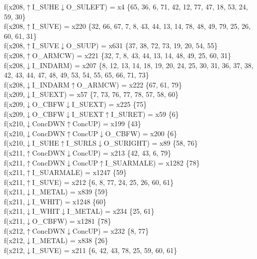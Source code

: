 f(x208,$\uparrow$I\_SUHE$\downarrow$O\_SULEFT) = x4 \{65, 36, 6, 71, 42, 12, 77, 47, 18, 53, 24, 59, 30\} \\  
f(x208,$\uparrow$I\_SUVE) = x220 \{32, 66, 67, 7, 8, 43, 44, 13, 14, 78, 48, 49, 79, 25, 26, 60, 61, 31\} \\  
f(x208,$\uparrow$I\_SUVE$\downarrow$O\_SUUP) = x631 \{37, 38, 72, 73, 19, 20, 54, 55\} \\  
f(x208,$\uparrow$O\_ARMCW) = x221 \{32, 7, 8, 43, 44, 13, 14, 48, 49, 25, 60, 31\} \\  
f(x208,$\downarrow$I\_INDARM) = x207 \{8, 12, 13, 14, 18, 19, 20, 24, 25, 30, 31, 36, 37, 38, 42, 43, 44, 47, 48, 49, 53, 54, 55, 65, 66, 71, 73\} \\  
f(x208,$\downarrow$I\_INDARM$\uparrow$O\_ARMCW) = x222 \{67, 61, 79\} \\  
f(x209,$\downarrow$I\_SUEXT) = x57 \{7, 73, 76, 77, 78, 57, 58, 60\} \\  
f(x209,$\downarrow$O\_CBFW$\downarrow$I\_SUEXT) = x225 \{75\} \\  
f(x209,$\downarrow$O\_CBFW$\downarrow$I\_SUEXT$\uparrow$I\_SURET) = x59 \{6\} \\  
f(x210,$\downarrow$ConcDWN$\uparrow$ConcUP) = x199 \{43\} \\  
f(x210,$\downarrow$ConcDWN$\uparrow$ConcUP$\downarrow$O\_CBFW) = x200 \{6\} \\  
f(x210,$\downarrow$I\_SUHE$\uparrow$I\_SURLS$\downarrow$O\_SURIGHT) = x89 \{58, 76\} \\  
f(x211,$\uparrow$ConcDWN$\downarrow$ConcUP) = x213 \{42, 43, 6, 79\} \\  
f(x211,$\uparrow$ConcDWN$\downarrow$ConcUP$\uparrow$I\_SUARMALE) = x1282 \{78\} \\  
f(x211,$\uparrow$I\_SUARMALE) = x1247 \{59\} \\  
f(x211,$\uparrow$I\_SUVE) = x212 \{6, 8, 77, 24, 25, 26, 60, 61\} \\  
f(x211,$\downarrow$I\_METAL) = x839 \{59\} \\  
f(x211,$\downarrow$I\_WHIT) = x1248 \{60\} \\  
f(x211,$\downarrow$I\_WHIT$\downarrow$I\_METAL) = x234 \{25, 61\} \\  
f(x211,$\downarrow$O\_CBFW) = x1281 \{78\} \\  
f(x212,$\uparrow$ConcDWN$\downarrow$ConcUP) = x232 \{8, 77\} \\  
f(x212,$\downarrow$I\_METAL) = x838 \{26\} \\  
f(x212,$\downarrow$I\_SUVE) = x211 \{6, 42, 43, 78, 25, 59, 60, 61\} \\  
